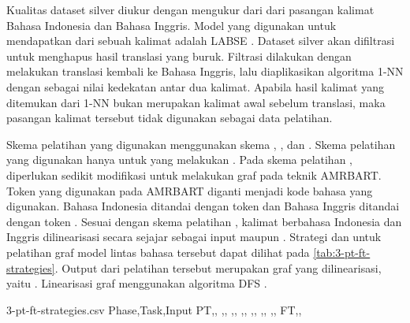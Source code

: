 Kualitas dataset silver diukur dengan mengukur \cossim{} dari \multil{}  dari pasangan kalimat Bahasa Indonesia dan Bahasa Inggris.
Model \mwordem{} yang digunakan untuk mendapatkan \multil{}  dari sebuah kalimat adalah \gls{LABSE} .
Dataset silver akan difiltrasi untuk menghapus hasil translasi yang buruk.
Filtrasi dilakukan dengan melakukan translasi kembali ke Bahasa Inggris, lalu diaplikasikan algoritma \gls{1-NN} dengan \cossim{} sebagai nilai kedekatan antar dua kalimat.
Apabila hasil kalimat yang ditemukan dari \gls{1-NN} bukan merupakan kalimat awal sebelum translasi, maka pasangan kalimat tersebut tidak digunakan sebagai data pelatihan.

Skema pelatihan yang digunakan menggunakan skema , , dan .
Skema pelatihan yang digunakan hanya untuk yang melakukan \amrparsing{}.
Pada skema pelatihan , diperlukan sedikit modifikasi untuk melakukan \pretraining{} graf pada teknik \gls{AMRBART}.
Token  yang digunakan pada \gls{AMRBART} diganti menjadi kode bahasa yang digunakan.
Bahasa Indonesia ditandai dengan token  dan Bahasa Inggris ditandai dengan token .
Sesuai dengan skema pelatihan , kalimat berbahasa Indonesia dan Inggris dilinearisasi secara sejajar sebagai input \pretraining{} maupun \finetuning{}.
Strategi \pretraining{} dan \finetuning{} untuk pelatihan graf model \amrparsing{} lintas bahasa tersebut dapat dilihat pada \cref{tab:3-pt-ft-strategies}.
Output dari pelatihan tersebut merupakan graf \AMR{} yang dilinearisasi, yaitu .
Linearisasi graf menggunakan algoritma \gls{DFS} .

\begin{filecontents*}{3-pt-ft-strategies.csv}
Phase,Task,Input
PT,,
,,
,,
,,
,,
,,
,,
FT,,
\end{filecontents*}

